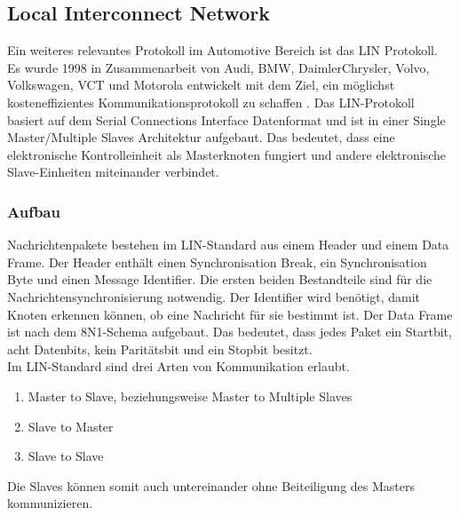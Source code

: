 \subsection{Local Interconnect Network}
Ein weiteres relevantes Protokoll im Automotive Bereich ist das \ac{LIN} Protokoll. Es wurde 1998 in Zusammenarbeit von Audi, BMW, DaimlerChrysler, Volvo, Volkswagen, VCT und Motorola entwickelt mit dem Ziel, ein möglichst kosteneffizientes Kommunikationsprotokoll zu schaffen \cite[57]{Fijalkowski.2011}.
Das \acs{LIN}-Protokoll basiert auf dem Serial Connections Interface Datenformat und ist in einer Single Master/Multiple Slaves Architektur aufgebaut. Das bedeutet, dass eine elektronische Kontrolleinheit als Masterknoten fungiert und andere elektronische Slave-Einheiten miteinander verbindet.

\subsubsection{Aufbau}
Nachrichtenpakete bestehen im \acs{LIN}-Standard aus einem Header und einem Data Frame. Der Header enthält einen Synchronisation Break, ein Synchronisation Byte und einen Message Identifier. Die ersten beiden Bestandteile sind für die Nachrichtensynchronisierung notwendig. Der Identifier wird benötigt, damit Knoten erkennen können, ob eine Nachricht für sie bestimmt ist. Der Data Frame ist nach dem 8N1-Schema aufgebaut. Das bedeutet, dass jedes Paket ein Startbit, acht Datenbits, kein Paritätsbit und ein Stopbit besitzt. \cite[58]{Fijalkowski.2011} \\
Im \acs{LIN}-Standard sind drei Arten von Kommunikation erlaubt.
\begin{enumerate}
\item Master to Slave, beziehungsweise Master to Multiple Slaves
\item Slave to Master
\item Slave to Slave
\end{enumerate}
Die Slaves können somit auch untereinander ohne Beiteiligung des Masters kommunizieren. \cite[59]{Fijalkowski.2011}

